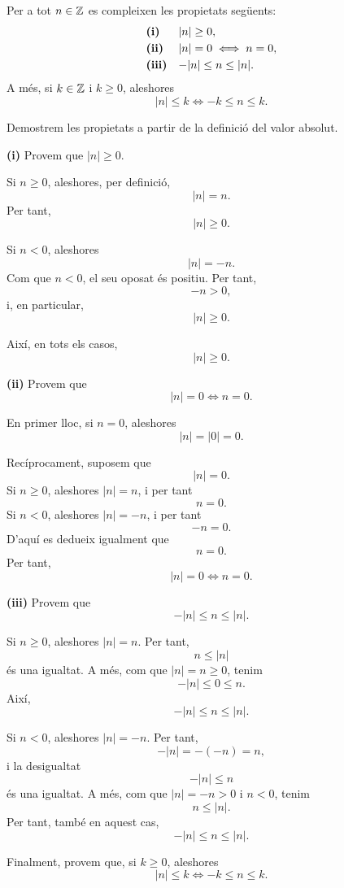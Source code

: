 \begin{proposicio}\label{prop:valor-absolut-enters}
Per a tot $n\in\mathbb{Z}$ es compleixen les propietats següents:
\[
\begin{array}{ll}
\text{\textbf{(i)}} & |n|\geq 0,\\[1mm]
\text{\textbf{(ii)}} & |n|=0 \iff n=0,\\[1mm]
\text{\textbf{(iii)}} & -|n|\leq n\leq |n|.
\end{array}
\]
A més, si $k\in\mathbb{Z}$ i $k\geq 0$, aleshores
\[
|n|\leq k \iff -k\leq n\leq k.
\]
\end{proposicio}

\begin{prova}
Demostrem les propietats a partir de la definició del valor absolut.

\medskip

\noindent\textbf{(i)} Provem que $|n|\geq 0$.

Si $n\geq 0$, aleshores, per definició,
\[
|n|=n.
\]
Per tant,
\[
|n|\geq 0.
\]

Si $n<0$, aleshores
\[
|n|=-n.
\]
Com que $n<0$, el seu oposat és positiu. Per tant,
\[
-n>0,
\]
i, en particular,
\[
|n|\geq 0.
\]

Així, en tots els casos,
\[
|n|\geq 0.
\]

\medskip

\noindent\textbf{(ii)} Provem que
\[
|n|=0 \iff n=0.
\]

En primer lloc, si $n=0$, aleshores
\[
|n|=|0|=0.
\]

Recíprocament, suposem que
\[
|n|=0.
\]
Si $n\geq 0$, aleshores $|n|=n$, i per tant
\[
n=0.
\]
Si $n<0$, aleshores $|n|=-n$, i per tant
\[
-n=0.
\]
D'aquí es dedueix igualment que
\[
n=0.
\]
Per tant,
\[
|n|=0 \iff n=0.
\]

\medskip

\noindent\textbf{(iii)} Provem que
\[
-|n|\leq n\leq |n|.
\]

Si $n\geq 0$, aleshores $|n|=n$. Per tant,
\[
n\leq |n|
\]
és una igualtat. A més, com que $|n|=n\geq 0$, tenim
\[
-|n|\leq 0\leq n.
\]
Així,
\[
-|n|\leq n\leq |n|.
\]

Si $n<0$, aleshores $|n|=-n$. Per tant,
\[
-|n|=-(-n)=n,
\]
i la desigualtat
\[
-|n|\leq n
\]
és una igualtat. A més, com que $|n|=-n>0$ i $n<0$, tenim
\[
n\leq |n|.
\]
Per tant, també en aquest cas,
\[
-|n|\leq n\leq |n|.
\]

\medskip

Finalment, provem que, si $k\geq 0$, aleshores
\[
|n|\leq k \iff -k\leq n\leq k.
\]


\end{prova}
